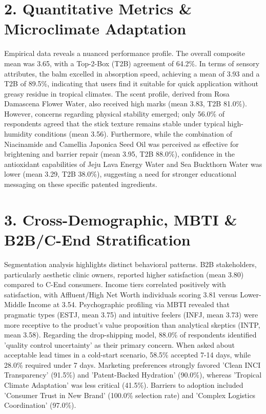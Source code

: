 \documentclass[10pt,twocolumn,a4paper]{article}
\begin{document}
\section{2. Quantitative Metrics \& Microclimate Adaptation}
Empirical data reveals a nuanced performance profile. The overall composite mean was 3.65, with a Top-2-Box (T2B) agreement of 64.2\%. In terms of sensory attributes, the balm excelled in absorption speed, achieving a mean of 3.93 and a T2B of 89.5\%, indicating that users find it suitable for quick application without greasy residue in tropical climates. The scent profile, derived from Rosa Damascena Flower Water, also received high marks (mean 3.83, T2B 81.0\%). However, concerns regarding physical stability emerged; only 56.0\% of respondents agreed that the stick texture remains stable under typical high-humidity conditions (mean 3.56). Furthermore, while the combination of Niacinamide and Camellia Japonica Seed Oil was perceived as effective for brightening and barrier repair (mean 3.95, T2B 88.0\%), confidence in the antioxidant capabilities of Jeju Lava Energy Water and Sea Buckthorn Water was lower (mean 3.29, T2B 38.0\%), suggesting a need for stronger educational messaging on these specific patented ingredients.
\section{3. Cross-Demographic, MBTI \& B2B/C-End Stratification}
Segmentation analysis highlights distinct behavioral patterns. B2B stakeholders, particularly aesthetic clinic owners, reported higher satisfaction (mean 3.80) compared to C-End consumers. Income tiers correlated positively with satisfaction, with Affluent/High Net Worth individuals scoring 3.81 versus Lower-Middle Income at 3.54. Psychographic profiling via MBTI revealed that pragmatic types (ESTJ, mean 3.75) and intuitive feelers (INFJ, mean 3.73) were more receptive to the product's value proposition than analytical skeptics (INTP, mean 3.58). Regarding the drop-shipping model, 88.0\% of respondents identified 'quality control uncertainty' as their primary concern. When asked about acceptable lead times in a cold-start scenario, 58.5\% accepted 7-14 days, while 28.0\% required under 7 days. Marketing preferences strongly favored 'Clean INCI Transparency' (91.5\%) and 'Patent-Backed Hydration' (90.0\%), whereas 'Tropical Climate Adaptation' was less critical (41.5\%). Barriers to adoption included 'Consumer Trust in New Brand' (100.0\% selection rate) and 'Complex Logistics Coordination' (97.0\%).
\end{document}
